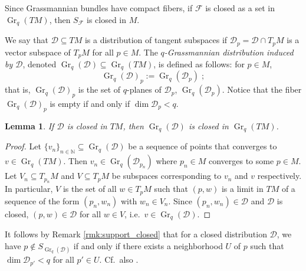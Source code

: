 \documentclass[12pt]{amsart}
\newtheorem{lem}[theorem]{Lemma}
\numberwithin{equation}{section}
{\theoremstyle{definition}
\newtheorem{remark}[theorem]{Remark}
}
\DeclareMathOperator{\Grass}{Gr}
\newcommand{\Gr}{\Grass}
\newcommand{\D}{\mathcal{D}}
\begin{document}
\begin{remark}\label{rmk:support_closed}
   Since Grassmannian bundles have compact fibers, if $\mathcal{F}$ is closed as a set in $\Gr_q(TM)$, then $S_{\mathcal{F}}$ is closed in $M$.
\end{remark}

We say that $\mathcal{D}\subseteq TM$ is a distribution of tangent subspaces if $\mathcal{D}_p=\mathcal{D}\cap T_pM$ is a vector subspace of $T_pM$ for all $p\in M$. The \emph{$q$-Grassmannian distribution induced by $\mathcal{D}$}, denoted $\Gr_q(\mathcal{D})\subseteq \Gr_q(TM)$, is
defined as follows: for $p\in M$,
$$\Gr_q(\mathcal{D})_p:=\Gr_q(\mathcal{D}_p)\;;$$
that is, $\Gr_q(\mathcal{D})_p$ is the set of $q$-planes of $\mathcal{D}_p$, $\Gr_q(\mathcal{D}_p)$.  Notice that the fiber $\Gr_q(\D)_p$ is empty if and only if $\dim \D_p<q$.

\begin{lem}
    If $\D$ is closed in $TM$, then $\Gr_q(\D)$ is closed in $\Gr_q(TM)$.
\end{lem}

\begin{proof}
    Let $\{v_n\}_{n\in\mathbb{N}}\subseteq\Gr_q(\D)$ be a sequence of points that converges to $v\in\Gr_q(TM)$. Then $v_n\in \Gr_q(\D_{p_n})$ where $p_n\in M$ converges to some $p\in M$. 
    Let $V_n \subseteq T_{p_n}M$ and $V \subseteq T_pM$ be subspaces corresponding to $v_n$ and $v$ respectively.  In particular, $V$ is the set of all $w \in T_pM$ such that $(p,w)$ is a limit in $TM$ of a sequence of the form $(p_n, w_n)$ with $w_n \in V_n$. Since $(p_n,w_n)\in \mathcal{D}$ and $\D$ is closed, $(p, w)\in \D$ for all $w\in V$, i.e.~$v\in\Gr_q(\D)$.
    
\end{proof}

\begin{remark}\label{rem_dimlessk} It follows by Remark \ref{rmk:support_closed} that for a closed distribution $\mathcal{D}$, we have $ p\not\in S_{\Gr_q(\D)}$ if and only if there exists a neighborhood $U$ of $p$ such that $\dim \D_{p'}<q$ for all $p'\in U$.
  Cf.~also \cite[Proposition 2.3]{DaMo21}. %
\end{remark}
\end{document}
